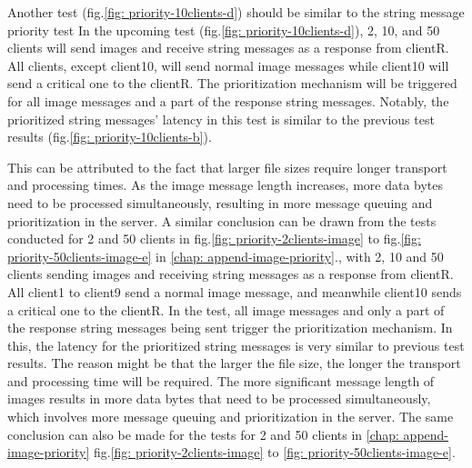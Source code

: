 Another test (fig.\ref{fig: priority-10clients-d}) should be similar to the string message priority test In the upcoming test (fig.\ref{fig: priority-10clients-d}), 2, 10, and 50 clients will send images and receive string messages as a response from clientR. All clients, except client10, will send normal image messages while client10 will send a critical one to the clientR. The prioritization mechanism will be triggered for all image messages and a part of the response string messages. Notably, the prioritized string messages' latency in this test is similar to the previous test results (fig.\ref{fig: priority-10clients-b}). 

This can be attributed to the fact that larger file sizes require longer transport and 
processing times. As the image message length increases, more data bytes need to be 
processed simultaneously, resulting in more message queuing and prioritization in the 
server. A similar conclusion can be drawn from the tests conducted for 2 and 50 clients 
in fig.\ref{fig: priority-2clients-image} to fig.\ref{fig: priority-50clients-image-e} 
in \ref{chap: append-image-priority}., 
with 2, 10 and 50 clients sending images and receiving string messages as a response 
from clientR. All client1 to client9 send a normal image message, and meanwhile client10 
sends a critical one to the clientR. In the test, all image messages and only a part of 
the response string messages being sent trigger the prioritization mechanism. In this, 
the latency for the prioritized string messages is very similar to previous test results.
The reason might be that the larger the file size, the longer the transport 
and processing time will be required. The more significant message length of images 
results in more data bytes that need to be processed simultaneously, which involves 
more message queuing and prioritization in the server. The same conclusion can also be 
made for the tests for 2 and 50 clients in \ref{chap: append-image-priority} 
fig.\ref{fig: priority-2clients-image} to \ref{fig: priority-50clients-image-e}.


